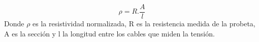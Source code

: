 \documentclass[a4paper,12pt,fleqn,twoside,openany]{book}
\begin{document}
\begin{equation}
 \rho = R . \frac{A}{l}
\end{equation}
Donde $\rho$ es la resistividad normalizada, R es la resistencia medida de la probeta, A es la sección y l la longitud entre los cables que miden la tensión.


 
\end{document}
